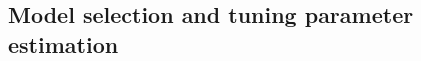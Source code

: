 \documentclass[12pt]{article}
\newcommand{\vsigmasq}{\mbox{\boldmath $\sigma^2$}}
\theoremstyle{definition}
\begin{document}
%
%
%
%


\subsection{Model selection and tuning parameter estimation}





\end{document}
